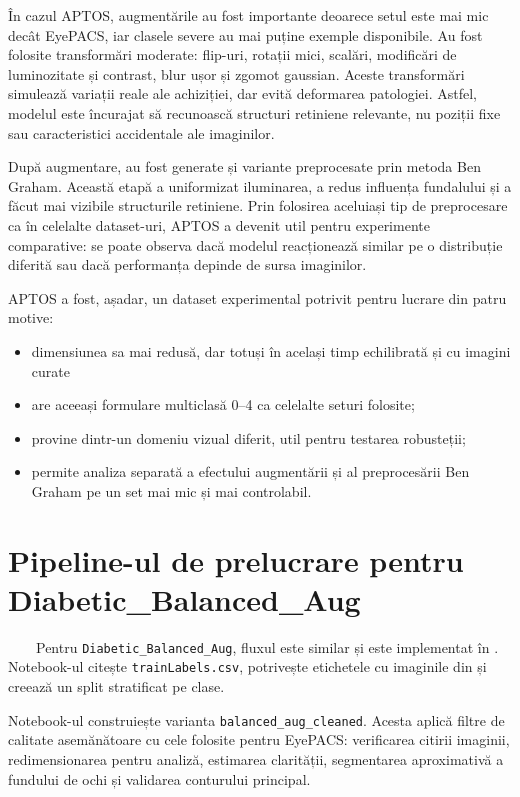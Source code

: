 \documentclass[12pt, a4paper, twoside, romanian]{teza-upb}
\begin{document}
În cazul APTOS, augmentările au fost importante deoarece setul este mai mic decât EyePACS, iar
clasele severe au mai puține exemple disponibile. Au fost folosite transformări moderate:
flip-uri, rotații mici, scalări, modificări de luminozitate și contrast, blur ușor și zgomot
gaussian. Aceste transformări simulează variații reale ale achiziției, dar evită deformarea
patologiei. Astfel, modelul este încurajat să recunoască structuri retiniene relevante, nu
poziții fixe sau caracteristici accidentale ale imaginilor.
\bigskip

După augmentare, au fost generate și variante preprocesate prin metoda Ben Graham. Această etapă
a uniformizat iluminarea, a redus influența fundalului și a făcut mai vizibile structurile
retiniene. Prin folosirea aceluiași tip de preprocesare ca în celelalte dataset-uri, APTOS a
devenit util pentru experimente comparative: se poate observa dacă modelul reacționează similar
pe o distribuție diferită sau dacă performanța depinde de sursa imaginilor.
\bigskip

APTOS a fost, așadar, un dataset experimental potrivit pentru lucrare din patru motive:

\begin{itemize}
  \item dimensiunea sa mai redusă, dar totuși în același timp echilibrată și cu imagini curate
  \item are aceeași formulare multiclasă 0--4 ca celelalte seturi folosite;
  \item provine dintr-un domeniu vizual diferit, util pentru testarea robusteții;
  \item permite analiza separată a efectului augmentării și al preprocesării Ben Graham pe un set mai mic și mai controlabil.
\end{itemize}

\section{Pipeline-ul de prelucrare pentru Diabetic\_Balanced\_Aug}

\ \ \ \ Pentru \texttt{Diabetic\_Balanced\_Aug}, fluxul este similar și este implementat în
. Notebook-ul  citește
\texttt{trainLabels.csv}, potrivește etichetele cu imaginile din  și
creează un split stratificat pe clase.
\bigskip

Notebook-ul  construiește varianta \texttt{balanced\_aug\_cleaned}.
\newline
Acesta aplică filtre de calitate asemănătoare cu cele folosite pentru EyePACS: verificarea
citirii imaginii, redimensionarea pentru analiză, estimarea clarității, segmentarea aproximativă
a fundului de ochi și validarea conturului principal.
\bigskip
\end{document}
